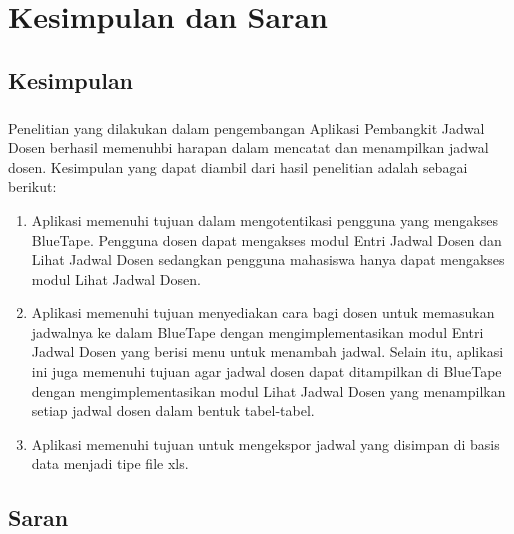 \chapter{Kesimpulan dan Saran}
\section{Kesimpulan}
\paragraph{} Penelitian yang dilakukan dalam pengembangan Aplikasi Pembangkit Jadwal Dosen berhasil memenuhbi harapan dalam mencatat dan menampilkan jadwal dosen. Kesimpulan yang dapat diambil dari hasil penelitian adalah sebagai berikut:
\begin{enumerate}
	\item Aplikasi memenuhi tujuan dalam mengotentikasi pengguna yang mengakses BlueTape. Pengguna dosen dapat mengakses modul Entri Jadwal Dosen dan Lihat Jadwal Dosen sedangkan pengguna mahasiswa hanya dapat mengakses modul Lihat Jadwal Dosen.
	\item Aplikasi memenuhi tujuan menyediakan cara bagi dosen untuk memasukan jadwalnya ke dalam BlueTape dengan mengimplementasikan modul Entri Jadwal Dosen yang berisi menu untuk menambah jadwal. Selain itu, aplikasi ini juga memenuhi tujuan agar jadwal dosen dapat ditampilkan di BlueTape dengan mengimplementasikan modul Lihat Jadwal Dosen yang menampilkan setiap jadwal dosen dalam bentuk tabel-tabel.
	\item Aplikasi memenuhi tujuan untuk mengekspor jadwal yang disimpan di basis data menjadi tipe file xls.
\end{enumerate}

\section{Saran}